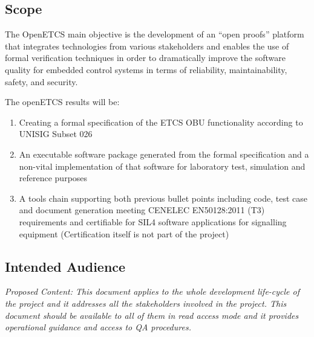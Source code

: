 \documentclass{template/openetcs_article}
\begin{document}
\subsection{Scope}

The OpenETCS main objective is the development of an ``open proofs'' platform that integrates technologies from various stakeholders and enables the use of formal verification techniques in order to dramatically improve the software quality for embedded control systems in terms of reliability, maintainability, safety, and security.


The openETCS results will be:
\begin{enumerate}
\item Creating a formal specification of the ETCS OBU functionality according to UNISIG Subset 026

\item An executable software package generated from the formal specification and a non-vital implementation of that software for laboratory test, simulation and reference purposes

\item A tools chain supporting both previous bullet points including code, test case and document generation meeting CENELEC EN50128:2011 (T3) requirements and certifiable for SIL4 software applications for signalling equipment (Certification itself is not part of the project)
\end{enumerate}


\subsection{Intended Audience}
\textit{Proposed Content: This document applies to the whole development life-cycle of the project and it addresses all the stakeholders involved in the project. This document should be available to all of them in read access mode and it provides operational guidance and access to QA procedures.}

\end{document}
